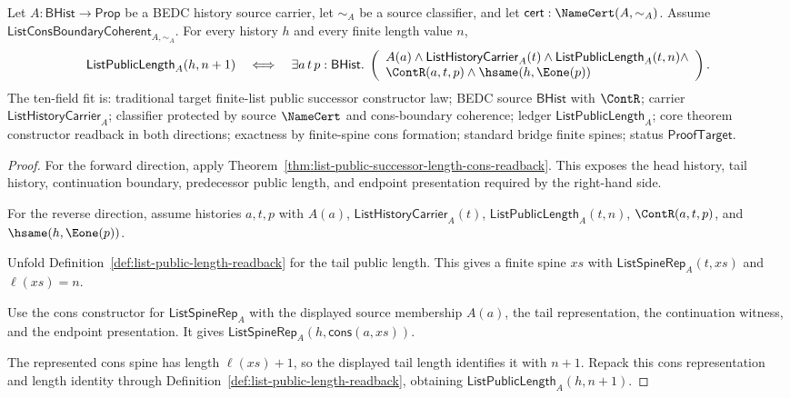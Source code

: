\begin{theorem}
\label{thm:list-public-successor-length-constructor-exactness}
Let $A:\mathsf{BHist}\to\mathsf{Prop}$ be a BEDC history source carrier, let
$\sim_A$ be a source classifier, and let
$\mathsf{cert}:\NameCert(A,\sim_A)$. Assume
$\mathsf{ListConsBoundaryCoherent}_{A,\sim_A}$. For every history $h$ and every
finite length value $n$,
$$
\mathsf{ListPublicLength}_A(h,n+1)
\quad\Longleftrightarrow\quad
\exists a\,t\,p:\mathsf{BHist}.\;
\left(
\begin{array}{l}
A(a)\land \mathsf{ListHistoryCarrier}_A(t)\land
\mathsf{ListPublicLength}_A(t,n)\land\\
\ContR(a,t,p)\land \hsame(h,\Eone(p))
\end{array}
\right).
$$
The ten-field fit is: traditional target finite-list public successor
constructor law; BEDC source $\mathsf{BHist}$ with $\ContR$; carrier
$\mathsf{ListHistoryCarrier}_A$; classifier protected by source $\NameCert$ and
cons-boundary coherence; ledger $\mathsf{ListPublicLength}_A$; core theorem
constructor readback in both directions; exactness by finite-spine cons
formation; standard bridge finite spines; status $\mathsf{ProofTarget}$.
\end{theorem}
\begin{proof}
For the forward direction, apply
Theorem~\ref{thm:list-public-successor-length-cons-readback}. This exposes the
head history, tail history, continuation boundary, predecessor public length,
and endpoint presentation required by the right-hand side.

For the reverse direction, assume histories $a,t,p$ with $A(a)$,
$\mathsf{ListHistoryCarrier}_A(t)$, $\mathsf{ListPublicLength}_A(t,n)$,
$\ContR(a,t,p)$, and $\hsame(h,\Eone(p))$.

Unfold Definition~\ref{def:list-public-length-readback} for the tail public
length. This gives a finite spine $xs$ with
$\mathsf{ListSpineRep}_A(t,xs)$ and $\ell(xs)=n$.

Use the cons constructor for $\mathsf{ListSpineRep}_A$ with the displayed
source membership $A(a)$, the tail representation, the continuation witness,
and the endpoint presentation. It gives
$\mathsf{ListSpineRep}_A(h,\mathsf{cons}(a,xs))$.

The represented cons spine has length $\ell(xs)+1$, so the displayed tail
length identifies it with $n+1$. Repack this cons representation and length
identity through Definition~\ref{def:list-public-length-readback}, obtaining
$\mathsf{ListPublicLength}_A(h,n+1)$.
\end{proof}

